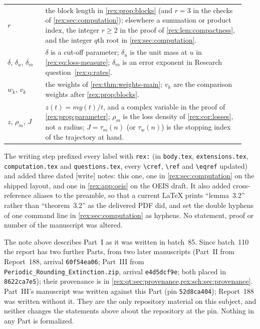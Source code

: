 \begin{writenote}
\begin{center}
\begin{tabular}{@{}p{0.15\linewidth}p{0.79\linewidth}@{}}
$r$ & the block length in \cref{rex:prop:blocks} (and $r=3$ in the checks of \cref{rex:sec:computation}); elsewhere a summation or product index, the integer $r\geq2$ in the proof of \cref{rex:lem:compactness}, and the integer $q$th root in \cref{rex:sec:computation}.\\
$\delta$, $\delta_u$, $\delta_m$ & $\delta$ is a cut-off parameter; $\delta_u$ is the unit mass at $u$ in \eqref{rex:eq:loss-measure}; $\delta_m$ is an error exponent in Research question~\ref{rex:q:rates}.\\
$w_k$, $v_k$ & the weights of \cref{rex:thm:weights-main}; $v_k$ are the comparison weights after \cref{rex:prop:blocks}.\\
$z$, $\rho_m$, $J$ & $z(t)=my(t)/t$, and a complex variable in the proof of \cref{rex:prop:parameter}; $\rho_m$ is the loss density of \cref{rex:cor:losses}, not a radius; $J=\tau_m(n)$ (or $\tau_w(n)$) is the stopping index of the trajectory at hand.\\
\bottomrule
\end{tabular}
\end{center}
The writing step prefixed every label with \texttt{rex:} (in \texttt{body.tex},
\texttt{extensions.tex}, \texttt{computation.tex} and \texttt{questions.tex},
every \verb|\cref|, \verb|\ref| and \verb|\eqref| updated) and added three
dated \textsf{[write]} notes: this one, one in
\cref{rex:sec:computation} on the shipped layout, and one in
\cref{rex:app:oeis} on the OEIS draft. It also added cross-reference
aliases to the preamble, so that a current \LaTeX{} prints ``lemma~3.2''
rather than ``theorem~3.2'' as the delivered PDF did, and set the double
hyphens of one command line in \cref{rex:sec:computation} as hyphens. No
statement, proof or number of the manuscript was altered.
\end{writenote}

\begin{writenote}
The note above describes Part~I as it was written in batch~85. Since
batch~110 the report has two further Parts, from two later manuscripts
(Part~II from Report~188, arrival \texttt{60f54ea06}; Part~III from
\texttt{Periodic\_\allowbreak Rounding\_\allowbreak Extinction.zip}, arrival
\texttt{e4d5dcf9e}; both placed in \texttt{8622ca7e5}); their provenance is
in \cref{rex:qt:sec:provenance,rex:sch:sec:provenance}. Part~III's
manuscript was written against this Part (pin \texttt{52d8ca404}); Report~188
was written without it. They are the only repository material on this
subject, and neither changes the statements above about the repository at
the pin. Nothing in any Part is formalized.
\end{writenote}

